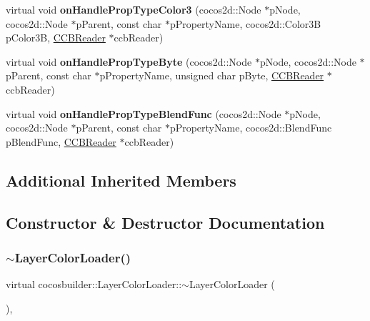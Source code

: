 \begin{DoxyCompactItemize}
\mbox{\label{classcocosbuilder_1_1LayerColorLoader_a60333fe128ac24804f2de7fae4abb1da}} 
virtual void {\bfseries on\+Handle\+Prop\+Type\+Color3} (cocos2d\+::\+Node $\ast$p\+Node, cocos2d\+::\+Node $\ast$p\+Parent, const char $\ast$p\+Property\+Name, cocos2d\+::\+Color3B p\+Color3B, \hyperlink{classcocosbuilder_1_1CCBReader}{C\+C\+B\+Reader} $\ast$ccb\+Reader)
\item 
\mbox{\label{classcocosbuilder_1_1LayerColorLoader_a8f67da70de6d035000f1efed8b5f34ab}} 
virtual void {\bfseries on\+Handle\+Prop\+Type\+Byte} (cocos2d\+::\+Node $\ast$p\+Node, cocos2d\+::\+Node $\ast$p\+Parent, const char $\ast$p\+Property\+Name, unsigned char p\+Byte, \hyperlink{classcocosbuilder_1_1CCBReader}{C\+C\+B\+Reader} $\ast$ccb\+Reader)
\item 
\mbox{\label{classcocosbuilder_1_1LayerColorLoader_ad03fd95af2e8756ba12d0fade5edadaa}} 
virtual void {\bfseries on\+Handle\+Prop\+Type\+Blend\+Func} (cocos2d\+::\+Node $\ast$p\+Node, cocos2d\+::\+Node $\ast$p\+Parent, const char $\ast$p\+Property\+Name, cocos2d\+::\+Blend\+Func p\+Blend\+Func, \hyperlink{classcocosbuilder_1_1CCBReader}{C\+C\+B\+Reader} $\ast$ccb\+Reader)
\end{DoxyCompactItemize}
\subsection*{Additional Inherited Members}


\subsection{Constructor \& Destructor Documentation}
\mbox{\label{classcocosbuilder_1_1LayerColorLoader_aab0b9805055647ceb1d06c0821082a05}} 
\subsubsection{\texorpdfstring{$\sim$\+Layer\+Color\+Loader()}{~LayerColorLoader()}\hspace{0.1cm}{\footnotesize\ttfamily [1/2]}}
{\footnotesize\ttfamily virtual cocosbuilder\+::\+Layer\+Color\+Loader\+::$\sim$\+Layer\+Color\+Loader (\begin{DoxyParamCaption}{ }\end{DoxyParamCaption})\hspace{0.3cm}{\ttfamily [inline]}, {\ttfamily [virtual]}}

